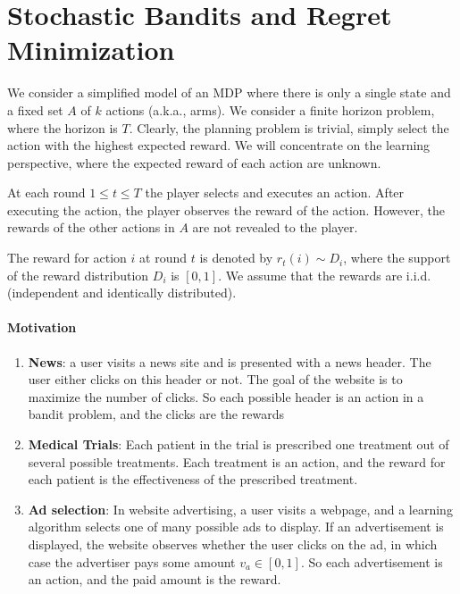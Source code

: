 

\section{Stochastic Bandits and Regret Minimization}

We consider a simplified model of an MDP where there is only a
single state and a fixed set $A$ of $k$ actions (a.k.a., arms). We
consider a finite horizon problem, where the horizon is $T$.
Clearly, the planning problem is trivial, simply select the action
with the highest expected reward. We will concentrate on the
learning perspective, where the expected reward of each action are
unknown.

At each round $1\leq t\leq T$ the player selects and executes an
action. After executing the action, the player observes the reward
of the action. However, the rewards of the other actions in $A$ are
not revealed to the player.

The reward for action $i$ at round $t$ is denoted by $r_{t}(i)\sim
D_{i}$, where the support of the reward distribution $D_{i}$ is
$[0,1]$. We assume that the rewards are i.i.d. (independent and
identically distributed).

\paragraph{Motivation}
\begin{enumerate}
\item \textbf{News}: a user visits a news site and is presented with a news
header. The user either clicks on this header or not. The goal of
the website is to maximize the number of clicks. So each possible
header is an action in a bandit problem, and the clicks are the
rewards
\item \textbf{Medical Trials}: Each patient in the trial is prescribed one
treatment out of several possible treatments. Each treatment is an
action, and the reward for each patient is the effectiveness of the
prescribed treatment.
\item \textbf{Ad selection}: In website advertising, a user visits a webpage,
and a learning algorithm selects one of many possible ads to
display. If an advertisement is displayed, the website observes
whether the user clicks on the ad, in which case the advertiser pays
some amount $v_{a} \in[0, 1]$. So each advertisement is an action,
and the paid amount is the reward.
\end{enumerate}

